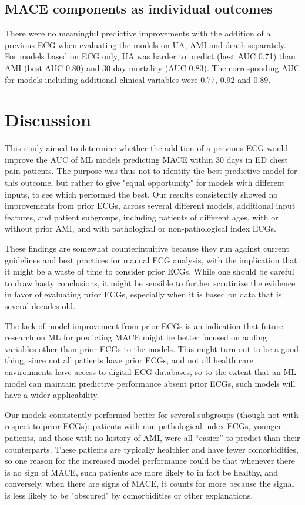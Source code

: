 \documentclass[preprint]{elsarticle}
\begin{document}
\subsection{MACE components as individual outcomes}
There were no meaningful predictive improvements with the addition of a previous ECG when evaluating the models on UA, AMI and death separately. For models based on ECG only, UA was harder to predict (best AUC 0.71) than AMI (best AUC 0.80) and 30-day mortality (AUC 0.83). The corresponding AUC for models including additional clinical variables were 0.77, 0.92 and 0.89. 

\section{Discussion}
This study aimed to determine whether the addition of a previous ECG would improve the AUC of ML models predicting MACE within 30 days in ED chest pain patients. The purpose was thus not to identify the best predictive model for this outcome, but rather to give "equal opportunity" for models with different inputs, to see which performed the best. Our results consistently showed no improvements from prior ECGs, across several different models, additional input features, and patient subgroups, including patients of different ages, with or without prior AMI, and with pathological or non-pathological index ECGs.

These findings are somewhat counterintuitive because they run against current guidelines and best practices for manual ECG analysis, with the implication that it might be a waste of time to consider prior ECGs. While one should be careful to draw hasty conclusions, it might be sensible to further scrutinize the evidence in favor of evaluating prior ECGs, especially when it is based on data that is several decades old.

The lack of model improvement from prior ECGs is an indication that future research on ML for predicting MACE might be better focused on adding variables other than prior ECGs to the models. This might turn out to be a good thing, since not all patients have prior ECGs, and not all health care environments have access to digital ECG databases, so to the extent that an ML model can maintain predictive performance absent prior ECGs, such models will have a wider applicability.

Our models consistently performed better for several subgroups (though not with respect to prior ECGs): patients with non-pathological index ECGs, younger patients, and those with no history of AMI, were all “easier” to predict than their counterparts. These patients are typically healthier and have fewer comorbidities, so one reason for the increased model performance could be that whenever there is no sign of MACE, such patients are more likely to in fact be healthy, and conversely, when there are signs of MACE, it counts for more because the signal is less likely to be "obscured" by comorbidities or other explanations.
\end{document}
